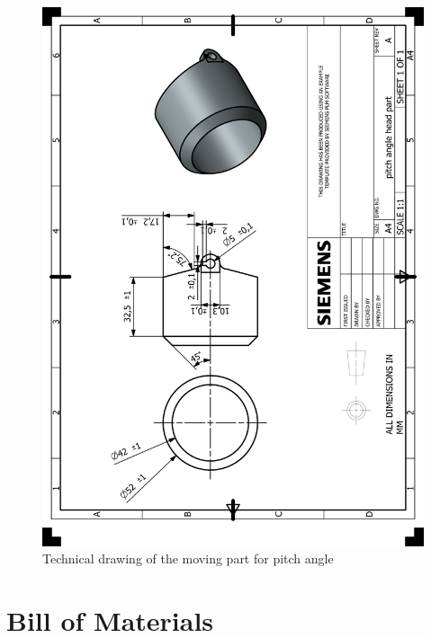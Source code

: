 \documentclass[12pt]{report}
\begin{document}
\begin{appendices}
\begin{figure}[H]
    \centering
    \includegraphics[width=\textwidth]{HP_pitch angle head part.png} 
    \caption{Technical drawing of the moving part for pitch angle}
    \label{fig:technical-drawing}
\end{figure}

\newpage





\section{Bill of Materials}


\end{appendices}
\end{document}
